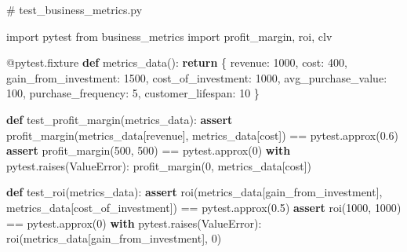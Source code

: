 \documentclass[
  letterpaper,
  DIV=11,
  numbers=noendperiod]{scrreprt}
\newenvironment{Shaded}{\begin{snugshade}}{\end{snugshade}}
\newcommand{\AttributeTok}[1]{\textcolor[rgb]{0.40,0.45,0.13}{#1}}
\newcommand{\CommentTok}[1]{\textcolor[rgb]{0.37,0.37,0.37}{#1}}
\newcommand{\ControlFlowTok}[1]{\textcolor[rgb]{0.00,0.23,0.31}{\textbf{#1}}}
\newcommand{\DecValTok}[1]{\textcolor[rgb]{0.68,0.00,0.00}{#1}}
\newcommand{\FloatTok}[1]{\textcolor[rgb]{0.68,0.00,0.00}{#1}}
\newcommand{\ImportTok}[1]{\textcolor[rgb]{0.00,0.46,0.62}{#1}}
\newcommand{\KeywordTok}[1]{\textcolor[rgb]{0.00,0.23,0.31}{\textbf{#1}}}
\newcommand{\NormalTok}[1]{\textcolor[rgb]{0.00,0.23,0.31}{#1}}
\newcommand{\OperatorTok}[1]{\textcolor[rgb]{0.37,0.37,0.37}{#1}}
\newcommand{\PreprocessorTok}[1]{\textcolor[rgb]{0.68,0.00,0.00}{#1}}
\newcommand{\StringTok}[1]{\textcolor[rgb]{0.13,0.47,0.30}{#1}}
\begin{document}
\begin{Shaded}
\begin{Highlighting}[]
\CommentTok{\# test\_business\_metrics.py}

\ImportTok{import}\NormalTok{ pytest}
\ImportTok{from}\NormalTok{ business\_metrics }\ImportTok{import}\NormalTok{ profit\_margin, roi, clv}

\AttributeTok{@pytest.fixture}
\KeywordTok{def}\NormalTok{ metrics\_data():}
    \ControlFlowTok{return}\NormalTok{ \{}
        \StringTok{\textquotesingle{}revenue\textquotesingle{}}\NormalTok{: }\DecValTok{1000}\NormalTok{,}
        \StringTok{\textquotesingle{}cost\textquotesingle{}}\NormalTok{: }\DecValTok{400}\NormalTok{,}
        \StringTok{\textquotesingle{}gain\_from\_investment\textquotesingle{}}\NormalTok{: }\DecValTok{1500}\NormalTok{,}
        \StringTok{\textquotesingle{}cost\_of\_investment\textquotesingle{}}\NormalTok{: }\DecValTok{1000}\NormalTok{,}
        \StringTok{\textquotesingle{}avg\_purchase\_value\textquotesingle{}}\NormalTok{: }\DecValTok{100}\NormalTok{,}
        \StringTok{\textquotesingle{}purchase\_frequency\textquotesingle{}}\NormalTok{: }\DecValTok{5}\NormalTok{,}
        \StringTok{\textquotesingle{}customer\_lifespan\textquotesingle{}}\NormalTok{: }\DecValTok{10}
\NormalTok{    \}}

\KeywordTok{def}\NormalTok{ test\_profit\_margin(metrics\_data):}
    \ControlFlowTok{assert}\NormalTok{ profit\_margin(metrics\_data[}\StringTok{\textquotesingle{}revenue\textquotesingle{}}\NormalTok{], metrics\_data[}\StringTok{\textquotesingle{}cost\textquotesingle{}}\NormalTok{]) }\OperatorTok{==}\NormalTok{ pytest.approx(}\FloatTok{0.6}\NormalTok{)}
    \ControlFlowTok{assert}\NormalTok{ profit\_margin(}\DecValTok{500}\NormalTok{, }\DecValTok{500}\NormalTok{) }\OperatorTok{==}\NormalTok{ pytest.approx(}\DecValTok{0}\NormalTok{)}
    \ControlFlowTok{with}\NormalTok{ pytest.raises(}\PreprocessorTok{ValueError}\NormalTok{):}
\NormalTok{        profit\_margin(}\DecValTok{0}\NormalTok{, metrics\_data[}\StringTok{\textquotesingle{}cost\textquotesingle{}}\NormalTok{])}

\KeywordTok{def}\NormalTok{ test\_roi(metrics\_data):}
    \ControlFlowTok{assert}\NormalTok{ roi(metrics\_data[}\StringTok{\textquotesingle{}gain\_from\_investment\textquotesingle{}}\NormalTok{], metrics\_data[}\StringTok{\textquotesingle{}cost\_of\_investment\textquotesingle{}}\NormalTok{]) }\OperatorTok{==}\NormalTok{ pytest.approx(}\FloatTok{0.5}\NormalTok{)}
    \ControlFlowTok{assert}\NormalTok{ roi(}\DecValTok{1000}\NormalTok{, }\DecValTok{1000}\NormalTok{) }\OperatorTok{==}\NormalTok{ pytest.approx(}\DecValTok{0}\NormalTok{)}
    \ControlFlowTok{with}\NormalTok{ pytest.raises(}\PreprocessorTok{ValueError}\NormalTok{):}
\NormalTok{        roi(metrics\_data[}\StringTok{\textquotesingle{}gain\_from\_investment\textquotesingle{}}\NormalTok{], }\DecValTok{0}\NormalTok{)}


\end{Highlighting}
\end{Shaded}
\end{document}

